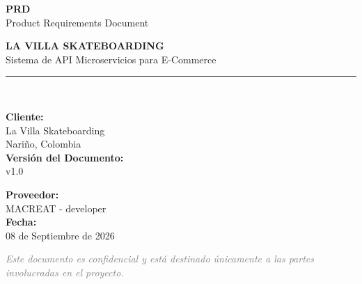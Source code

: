 \documentclass[11pt,a4paper]{article}
\newcommand{\apiversion}{v1.0}
\newcommand{\docdate}{08 de Septiembre de 2026}
\begin{document}
\begin{titlepage}
\centering
\vspace*{2cm}

{\Huge\bfseries\textcolor{sectioncolor}{PRD}\\[0.3cm]}
{\Large\textcolor{sectioncolor}{Product Requirements Document}\\[1.5cm]}

{\Large\textcolor{villafox}{\textbf{LA VILLA SKATEBOARDING}}}\\[0.5cm]
{\Large Sistema de API Microservicios para E-Commerce}\\[2cm]

\rule{\textwidth}{1.5pt}\\[1cm]

\begin{minipage}{0.45\textwidth}
\begin{flushleft}
\textbf{\textcolor{villafox}{Cliente:}}\\
La Villa Skateboarding\\
Nariño, Colombia\\[1cm]
\textbf{\textcolor{villafox}{Versión del Documento:}}\\
\apiversion\\
\end{flushleft}
\end{minipage}
\hfill
\begin{minipage}{0.45\textwidth}
\begin{flushright}
\textbf{\textcolor{villafox}{Proveedor:}}\\
MACREAT - developer\\[1cm]
\textbf{\textcolor{villafox}{Fecha:}}\\
\docdate\\
\end{flushright}
\end{minipage}

\vfill

\begin{minipage}{0.8\textwidth}
\centering
\textcolor{gray}{\textit{Este documento es confidencial y está destinado únicamente a las partes involucradas en el proyecto.}}
\end{minipage}

\vspace{1cm}
\end{titlepage}

\tableofcontents
\newpage
\end{document}
